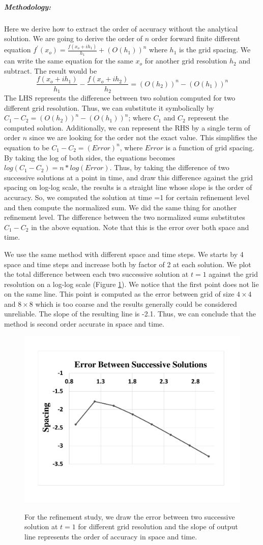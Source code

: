 \subparagraph{Methodology:} Here we derive how to extract the order of accuracy without the analytical solution. We are going to derive the order of $n$ order forward finite different equation $f^{\prime}(x_{o}) = \frac{f(x_{o}+ih_{1})}{h_{1}} + (O(h_{1}))^{n}$ where $h_{1}$ is the grid spacing. We can write the same equation for the same $x_{o}$ for another grid resolution $h_{2}$ and subtract. The result would be
$$
\frac{f(x_{o}+ih_{1})}{h_{1}} - \frac{f(x_{o}+ih_{2})}{h_{2}} = (O(h_{2}))^{n}-(O(h_{1}))^{n}
$$
The LHS represents the difference between two solution computed for two different grid resolution. Thus, we can substitute it symbolically by $C_{1} - C_{2} = (O(h_{2}))^{n}-(O(h_{1}))^{n}$;
where $C_{1}$ and $C_{2}$ represent the computed solution. Additionally, we can represent the RHS by a single term of order $n$ since we are looking for the order not the exact value. This simplifies the equation to be 
$C_{1} - C_{2} = (Error)^{n}$, where $Error$ is a function of grid spacing. By taking the log of both sides, the equations becomes $log(C_{1} - C_{2}) = n*log(Error)$. Thus, by taking the difference of two successive solutions at a point in time, and draw this difference against the grid spacing on log-log scale, the results is a straight line whose slope is the order of accuracy. So, we computed the solution at time =1 for certain refinement level and then compute the normalized sum. We did the same thing for another refinement level. The difference between the two normalized sums substitutes $C_{1}-C_{2}$ in the above equation. Note that this is the error over both space and time. 

We use the same method with different space and time steps. We starts by 4 space and time steps and increase both by factor of 2 at each solution. We plot the total difference between each two successive solution at $t=1$ against the grid resolution on a log-log scale (Figure \ref{fig:ref}). We notice that the first point does not lie on the same line. This point is computed as the error between grid of size $4\times4$ and $8\times8$ which is too coarse and the results generally could be considered unreliable. The slope of the resulting line is -2.1. Thus, we can conclude that the method is second order accurate in space and time. 
 
 \begin{figure}[!tbh]
 \centering  
   {\includegraphics[width=0.6\linewidth]{fig/ref_study_prob2.pdf}}   
  \caption{For the refinement study, we draw the error between two successive solution at $t=1$ for different grid resolution and the slope of output line represents the order of accuracy in space and time.}
   \label{fig:ref}
\end{figure} 